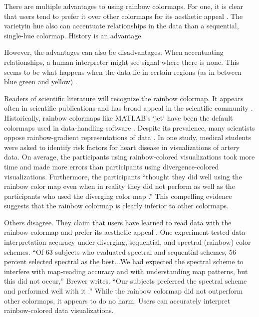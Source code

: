 \documentclass[journal]{IEEEtran}
\begin{document}
There are multiple advantages to using rainbow colormaps. For one, it is clear that users tend to prefer it
over other colormaps for its aesthetic appeal \cite{spectralschemes, choropleth, endofrainbow}. 
The varietyin hue also can accentuate relationships in the data than
a sequential, single-hue colormap. History is an advantage.
\par
However, the advantages can also be disadvantages.
When accentuating relationships, a human interpreter
might see signal where there is none. This seems to be
what happens when the data lie in certain regions (as in
between blue green and yellow) \cite{colorchoice}.
\par
Readers of scientific literature will recognize the rainbow colormap. 
It appears often in scientific publications and has 
broad appeal in the scientific community \cite{endofrainbow, rainbowstill, spectralschemes,mapchoropleth}.
 Historically, rainbow colormaps like
MATLAB’s ‘jet’ have been the default colormaps used
in data-handling software \cite{matlab}. Despite its prevalence, 
many scientists oppose rainbow-gradient representations of data \cite{rainbowstill, endofrainbow, viridis,arteryvis}.
 In one study, medical students were
asked to identify risk factors for heart disease in visualizations of artery data. On average, the participants
using rainbow-colored visualizations took more time
and made more errors than participants using divergence-colored visualizations. 
Furthermore, the participants “thought they did well using the rainbow color
map even when in reality they did not perform as well
as the participants who used the diverging color map
\cite{arteryvis}.” This compelling evidence suggests
that the rainbow colormap is clearly inferior to other
colormaps.
\par
Others disagree. They claim that users have learned to
read data with the rainbow colormap and prefer its aesthetic appeal \cite{spectralschemes, choropleth}. One
experiment tested data interpretation accuracy under
diverging, sequential, and spectral (rainbow) color
schemes. “Of 63 subjects who evaluated spectral and
sequential schemes, 56 percent selected spectral as the
best...We had expected the spectral scheme to interfere
with map-reading accuracy and with understanding
map patterns, but this did not occur,” Brewer writes.
“Our subjects preferred the spectral scheme and performed well with it \cite{spectralschemes}.”
 While the rainbow colormap did not outperform other colormaps, it
appears to do no harm. Users can accurately interpret
rainbow-colored data visualizations.
\end{document}
